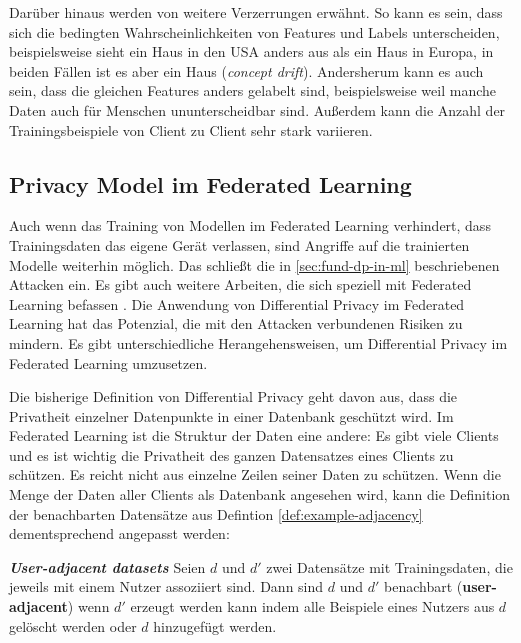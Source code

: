 Darüber hinaus werden von \textcite{kairouz:2021} weitere Verzerrungen erwähnt. So kann es sein, dass sich die bedingten Wahrscheinlichkeiten von Features und Labels unterscheiden, beispielsweise sieht ein Haus in den USA anders aus als ein Haus in Europa, in beiden Fällen ist es aber ein Haus (\textit{concept drift}). Andersherum kann es auch sein, dass die gleichen Features anders gelabelt sind, beispielsweise weil manche Daten auch für Menschen ununterscheidbar sind. Außerdem kann die Anzahl der Trainingsbeispiele von Client zu Client sehr stark variieren. 

\subsection{Privacy Model im Federated Learning}\label{sec:pm-in-fl}
Auch wenn das Training von Modellen im Federated Learning verhindert, dass Trainingsdaten das eigene Gerät verlassen, sind Angriffe auf die trainierten Modelle weiterhin möglich. Das schließt die in \autoref{sec:fund-dp-in-ml} beschriebenen Attacken ein. Es gibt auch weitere Arbeiten, die sich speziell mit Federated Learning befassen \cite{geiping:2020, wang:2019}. Die Anwendung von Differential Privacy im Federated Learning hat das Potenzial, die mit den Attacken verbundenen Risiken zu mindern. Es gibt unterschiedliche Herangehensweisen, um Differential Privacy im Federated Learning umzusetzen.

Die bisherige Definition von Differential Privacy geht davon aus, dass die Privatheit einzelner Datenpunkte in einer Datenbank geschützt wird. Im Federated Learning ist die Struktur der Daten eine andere: Es gibt viele Clients und es ist wichtig die Privatheit des ganzen Datensatzes eines Clients zu schützen. Es reicht nicht aus einzelne Zeilen seiner Daten zu schützen. Wenn die Menge der Daten aller Clients als Datenbank angesehen wird, kann die Definition der benachbarten Datensätze aus  Defintion \autoref{def:example-adjacency} dementsprechend angepasst werden:

\begin{definition}\label{def:user-adjacency}
	\emph{\textbf{User-adjacent datasets} \cite{mcmahan:2018}} Seien $d$ und $d'$ zwei Datensätze mit Trainingsdaten, die jeweils mit einem Nutzer assoziiert sind. Dann sind $d$ und $d'$ benachbart (\textbf{user-adjacent}) wenn $d'$ erzeugt werden kann indem alle Beispiele eines Nutzers aus $d$ gelöscht werden oder $d$ hinzugefügt werden.
\end{definition}


